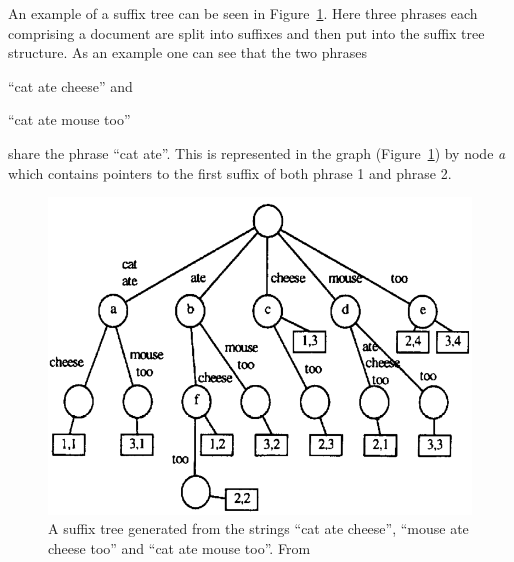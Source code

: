 An example of a suffix tree can be seen in Figure~\ref{fig:suffixtree}. Here three phrases each comprising a document are split into suffixes and then put into the suffix tree structure. As an example one can see that the two phrases
\begin{inparaenum}[\itshape 1\upshape)]
\item ``cat ate cheese'' and
\item ``cat ate mouse too''
\end{inparaenum}
share the phrase ``cat ate''. This is represented in the graph (Figure~\ref{fig:suffixtree}) by node \textit{a} which contains pointers to the first suffix of both phrase 1 and phrase 2.

\begin{figure}[!ht]
  \begin{center}
    \includegraphics[totalheight=0.3\textheight]{Figures/suffixtree}
  \end{center}
  \caption{A suffix tree generated from the strings “cat ate cheese”, “mouse ate cheese too” and “cat ate mouse too”. From  \protect \cite[][48]{Oren1998}}
  \label{fig:suffixtree}
\end{figure}

